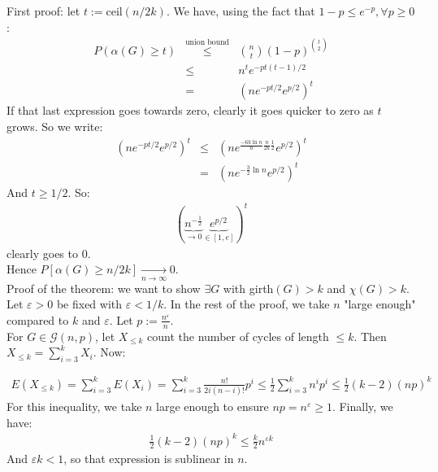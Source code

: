 First proof: let $t := \text{ceil}(n/2k)$. We have, using the fact that $1 - p \leq e^{-p}, \forall p \geq 0$:
\begin{eqnarray}
	P(\alpha(G) \geq t) &\overset{\text{union bound}}\leq& {{n}\choose{t}} (1 - p)^{{t}\choose{2}} \\
	&\leq& n^t e^{-pt(t-1)/2} \\
	&=& (ne^{-pt/2}e^{p/2})^t
\end{eqnarray}
If that last expression goes towards zero, clearly it goes quicker to zero as $t$ grows. So we write:
\begin{eqnarray}
	(ne^{-pt/2}e^{p/2})^t &\leq& (ne^{\frac{-6k\ln n}{n} \frac{n}{2k} \frac{1}{2}} e^{p/2})^t \\
	&=& (ne^{-\frac{3}{2} \ln n} e^{p/2})^t
\end{eqnarray}
And $t \geq 1/2$. So:
\begin{eqnarray}
	(\underbrace{n^{-\frac{1}{2}}}_{\rightarrow 0}  \underbrace{e^{p/2}}_{\in [1,e]})^t
\end{eqnarray}
clearly goes to 0.\\
Hence $P[\alpha(G) \geq n/2k] \underset{n \rightarrow \infty}\rightarrow 0$.\\

Proof of the theorem: we want to show $\exists G$ with girth$(G) > k$ and $\chi(G) > k$. Let $\varepsilon > 0$ be fixed with $\varepsilon < 1/k$. In the rest of the proof, we take $n$ "large enough" compared to $k$ and $\varepsilon$. Let $p := \frac{n^\varepsilon}{n}$.\\

For $G \in \mathcal{G}(n,p)$, let $X_{\leq k}$ count the number of cycles of length $\leq k$. Then $X_{\leq k} = \sum_{i = 3}^k X_i$. Now:

\begin{eqnarray}
	E(X_{\leq k}) = \sum_{i=3}^k E(X_i) = \sum_{i=3}^k \frac{n!}{2i(n-i)!} p^i \leq \frac{1}{2} \sum_{i=3}^k n^i p^i \leq \frac{1}{2} (k-2)(np)^k
\end{eqnarray}
For this inequality, we take $n$ large enough to ensure $np = n^\varepsilon \geq 1$. Finally, we have:
\begin{eqnarray}
	\frac{1}{2} (k-2)(np)^k \leq \frac{k}{2} n^{\varepsilon k}
\end{eqnarray}
And $\varepsilon k < 1$, so that expression is sublinear in $n$.


